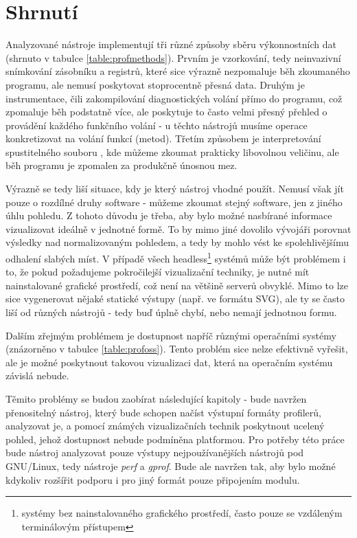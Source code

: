 \documentclass[czech,BP]{thesiskiv}
\begin{document}
\section{Shrnutí}

Analyzované nástroje implementují tři různé způsoby sběru výkonnostních dat (shrnuto v tabulce \ref{table:profmethods}). Prvním je vzorkování, tedy neinvazivní snímkování zásobníku a registrů, které sice výrazně nezpomaluje běh zkoumaného programu, ale nemusí poskytovat stoprocentně přesná data. Druhým je instrumentace, čili zakompilování diagnostických volání přímo do programu, což zpomaluje běh podstatně více, ale poskytuje to často velmi přesný přehled o provádění každého funkčního volání - u těchto nástrojů musíme operace konkretizovat na volání funkcí (metod). Třetím způsobem je interpretování spustitelného souboru , kde můžeme zkoumat prakticky libovolnou veličinu, ale běh programu je zpomalen za produkčně únosnou mez.

Výrazně se tedy liší situace, kdy je který nástroj vhodné použít. Nemusí však jít pouze o rozdílné druhy software - můžeme zkoumat stejný software, jen z jiného úhlu pohledu. Z tohoto důvodu je třeba, aby bylo možné nasbírané informace vizualizovat ideálně v jednotné formě. To by mimo jiné dovolilo vývojáři porovnat výsledky nad normalizovaným pohledem, a tedy by mohlo vést ke spolehlivějšímu odhalení slabých míst. V případě všech headless\footnote{systémy bez nainstalovaného grafického prostředí, často pouze se vzdáleným terminálovým přístupem} systémů může být problémem i to, že pokud požadujeme pokročilejší vizualizační techniky, je nutné mít nainstalované grafické prostředí, což není na většině serverů obvyklé. Mimo to lze sice vygenerovat nějaké statické výstupy (např. ve formátu SVG), ale ty se často liší od různých nástrojů - tedy buď úplně chybí, nebo nemají jednotnou formu.

Dalším zřejmým problémem je dostupnost napříč různými operačními systémy (znázorněno v tabulce \ref{table:profoss}). Tento problém sice nelze efektivně vyřešit, ale je možné poskytnout takovou vizualizaci dat, která na operačním systému závislá nebude.

Těmito problémy se budou zaobírat následující kapitoly - bude navržen přenositelný nástroj, který bude schopen načíst výstupní formáty profilerů, analyzovat je, a pomocí známých vizualizačních technik poskytnout ucelený pohled, jehož dostupnost nebude podmíněna platformou. Pro potřeby této práce bude nástroj analyzovat pouze výstupy nejpoužívanějších nástrojů pod GNU/Linux, tedy nástroje \emph{perf} a \emph{gprof}. Bude ale navržen tak, aby bylo možné kdykoliv rozšířit podporu i pro jiný formát pouze připojením modulu.
\end{document}
